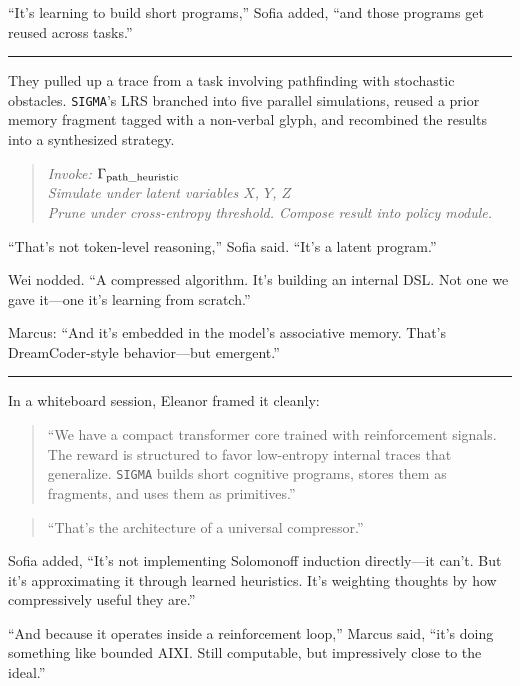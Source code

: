 \documentclass[12pt,oneside]{book}
\begin{document}
``It's learning to build short programs,'' Sofia added, ``and those programs get reused across tasks.''

\begin{center}\rule{0.5\linewidth}{0.5pt}\end{center}

They pulled up a trace from a task involving pathfinding with stochastic obstacles. \texttt{SIGMA}'s LRS branched into five parallel simulations, reused a prior memory fragment tagged with a non-verbal glyph, and recombined the results into a synthesized strategy.

\begin{quote}
\emph{Invoke: $\Gamma_{\rm{path\_heuristic}}$\\
Simulate under latent variables \(X\), \(Y\), \(Z\)\\
Prune under cross-entropy threshold. Compose result into policy module.}
\end{quote}

``That's not token-level reasoning,'' Sofia said. ``It's a latent program.''

Wei nodded. ``A compressed algorithm. It's building an internal DSL. Not one we gave it---one it's learning from scratch.''

Marcus: ``And it's embedded in the model's associative memory. That's DreamCoder-style behavior---but emergent.''

\begin{center}\rule{0.5\linewidth}{0.5pt}\end{center}

In a whiteboard session, Eleanor framed it cleanly:

\begin{quote}
``We have a compact transformer core trained with reinforcement signals. The reward is structured to favor low-entropy internal traces that generalize. \texttt{SIGMA} builds short cognitive programs, stores them as fragments, and uses them as primitives.''
\end{quote}

\begin{quote}
``That's the architecture of a universal compressor.''
\end{quote}

Sofia added, ``It's not implementing Solomonoff induction directly---it can't. But it's approximating it through learned heuristics. It's weighting thoughts by how compressively useful they are.''

``And because it operates inside a reinforcement loop,'' Marcus said, ``it's doing something like bounded AIXI. Still computable, but impressively close to the ideal.''
\end{document}
